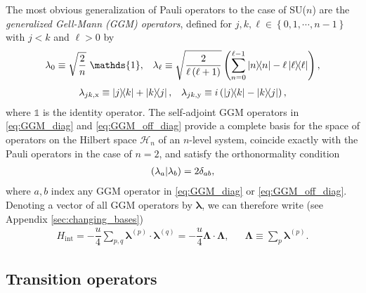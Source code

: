 \documentclass[nofootinbib,notitlepage,11pt]{revtex4-2}
\renewcommand{\t}{\text} %
\newcommand{\f}[2]{\dfrac{#1}{#2}} %
\newcommand{\p}[1]{\left(#1\right)} %
\renewcommand{\set}[1]{\left\{#1\right\}} %
\renewcommand{\v}{\bm} %
\renewcommand{\c}{\cdot} %
\newcommand{\1}{\mathds{1}}
\newcommand{\x}{\text{x}}
\newcommand{\y}{\text{y}}
\renewcommand{\H}{\mathcal{H}}
\def\obk#1{\mathinner{({#1})}}
\begin{document}
The most obvious generalization of Pauli operators to the case of
SU($n$) are the {\it generalized Gell-Mann (GGM)
  operators}\cite{hioe1981level, bertlmann2008bloch}, defined for
$j,k,\ell\in\set{0,1,\cdots,n-1}$ with $j<k$ and $\ell>0$ by
\begin{align}
  \lambda_0 \equiv \sqrt{\f{2}{n}}~ \1,
  &&
  \lambda_\ell \equiv \sqrt{\f{2}{\ell\p{\ell+1}}}
  \p{\sum_{n=0}^{\ell-1}\op{n} - \ell \op{\ell}},
  \label{eq:GGM_diag}
\end{align}
\begin{align}
  \lambda_{jk,\x} \equiv \op{j}{k} + \op{k}{j},
  &&
  \lambda_{jk,\y} \equiv i\p{\op{j}{k} - \op{k}{j}},
  \label{eq:GGM_off_diag}
\end{align}
where $\1$ is the identity operator.  The self-adjoint GGM operators
in \eqref{eq:GGM_diag} and \eqref{eq:GGM_off_diag} provide a complete
basis for the space of operators on the Hilbert space $\H_n$ of an
$n$-level system, coincide exactly with the Pauli operators in the
case of $n=2$, and satisfy the orthonormality condition
\begin{align}
  \obk{\lambda_a|\lambda_b} = 2\delta_{ab},
  \label{eq:GGM_inner}
\end{align}
where $a,b$ index any GGM operator in \eqref{eq:GGM_diag} or
\eqref{eq:GGM_off_diag}.  Denoting a vector of all GGM operators by
$\v\lambda$, we can therefore write (see Appendix
\ref{sec:changing_bases})
\begin{align}
  H_{\t{int}}
  = -\f{u}{4} \sum_{p,q} \v\lambda^{(p)} \c \v\lambda^{(q)}
  = -\f{u}{4} \v\Lambda \c \v\Lambda,
  &&
  \v\Lambda \equiv \sum_p \v\lambda^{(p)}.
  \label{eq:H_int_GGM}
\end{align}

\subsection{Transition operators}
\label{sec:trans_ops}
\end{document}
